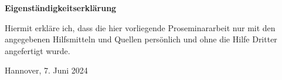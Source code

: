 \thispagestyle{empty}

\noindent
\begin{LARGE}
    \begin{center}
        \textbf{Eigenständigkeitserklärung} \\
    \end{center}
\end{LARGE}
    
\bigbreak
\bigbreak

\noindent
Hiermit erkläre ich, dass die hier vorliegende Proseminararbeit nur mit den angegebenen Hilfsmitteln
und Quellen persönlich und ohne die Hilfe Dritter angefertigt wurde.

\bigbreak
\bigbreak
\bigbreak
\bigbreak


Hannover, 7. Juni 2024
\bigbreak
{}